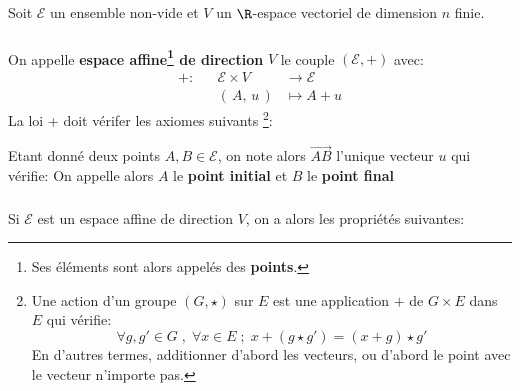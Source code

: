 \chapter*{} %
Soit \(\mathscr{E}\) un ensemble non-vide et \(V\) un \(\R\)-espace vectoriel de dimension \(n\) finie.
\subsection*{}
On appelle \textbf{espace affine\footnote[1]{Ses éléments sont alors appelés des \textbf{points}.} de direction} \(V\) le couple \((\mathscr{E}, +)\) avec:
\[
   \begin{aligned}
      + : &&\mathscr{E} \times V &\longrightarrow \mathscr{E}\\
      &&(\,A, \, u\,) &\longmapsto A + u
   \end{aligned}
\]
La loi + doit vérifer les axiomes suivants 
\footnote[2]{Une action d'un groupe \((G, \star)\) sur \(E\) est une application \(+\) de \(G \times E \) dans \(E\) qui vérifie: \[
   \forall g, g' \in G  \; , \; \forall x \in E \; ; \; x + (g \star g') = (x + g) \star g'
\] \hspace{15pt} En d'autres termes, additionner d'abord les vecteurs, ou d'abord le point avec le vecteur n'importe pas.}:

Etant donné deux points \(A, B \in \mathscr{E}\), on note alors \(\overrightarrow{AB}\) l'unique vecteur \(u\) qui vérifie:
On appelle alors \(A\) le \textbf{point initial} et \(B\) le \textbf{point final}
\subsection*{}
Si \(\mathscr{E}\) est un espace affine de direction \(V\), on a alors les propriétés suivantes:
